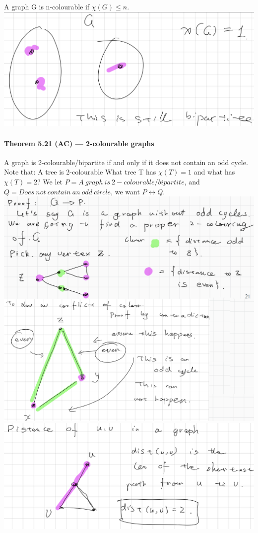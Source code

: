 \documentclass{article}
\begin{document}
A graph G is n-colourable if $\chi (G) \leq n$.\newline
\includegraphics{0083}
\paragraph{Theorem 5.21 (AC) — 2-colourable graphs}
A graph is 2-colourable/bipartite if and only if it does not
contain an odd cycle.\newline
Note that: A tree is 2-colourable\newline
What tree T has $\chi (T)=1$ and what has $\chi (T) =2$?\newline
We let $P=A\ graph\ is\ 2-colourable/bipartite$, and $Q=Does \ not \ contain \ an \ odd \ circle$, we want $P\longleftrightarrow Q$.\newline
\includegraphics{0084}\newline
\includegraphics{0085}\newline
\end{document}
